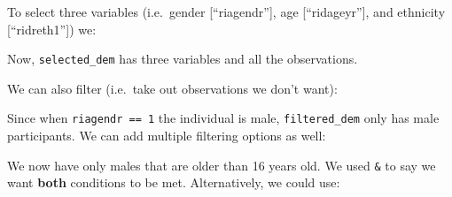 \documentclass[]{tufte-book}
\newenvironment{Shaded}{}{}
\newcommand{\KeywordTok}[1]{\textcolor[rgb]{0.00,0.44,0.13}{\textbf{#1}}}
\newcommand{\DecValTok}[1]{\textcolor[rgb]{0.25,0.63,0.44}{#1}}
\newcommand{\StringTok}[1]{\textcolor[rgb]{0.25,0.44,0.63}{#1}}
\newcommand{\OperatorTok}[1]{\textcolor[rgb]{0.40,0.40,0.40}{#1}}
\newcommand{\NormalTok}[1]{#1}
\theoremstyle{definition}
\theoremstyle{definition}
\theoremstyle{remark}
\begin{document}
To select three variables (i.e.~gender {[}``riagendr''{]}, age
{[}``ridageyr''{]}, and ethnicity {[}``ridreth1''{]}) we:

\begin{Shaded}
\end{Shaded}

Now, \texttt{selected\_dem} has three variables and all the
observations.

We can also filter (i.e.~take out observations we don't want):

\begin{Shaded}
\end{Shaded}

Since when \texttt{riagendr\ ==\ 1} the individual is male,
\texttt{filtered\_dem} only has male participants. We can add multiple
filtering options as well:

\begin{Shaded}
\end{Shaded}

We now have only males that are older than 16 years old. We used
\texttt{\&} to say we want \textbf{both} conditions to be met.
Alternatively, we could use:

\begin{Shaded}
\end{Shaded}
\end{document}
